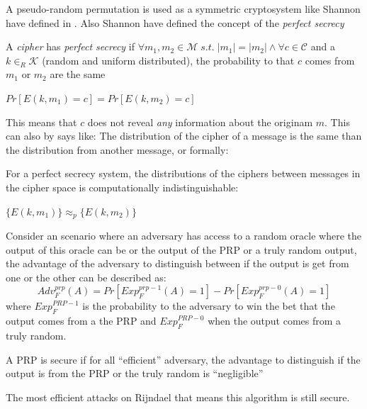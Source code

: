 \documentclass[a4paper,twoside]{llncs}
\begin{document}
A pseudo-random permutation is used as a symmetric cryptosystem like Shannon have defined in \cite{shannon-comTheorySecSys}. Also Shannon have defined the concept of the \emph{perfect secrecy}
\begin{definition}
 A \emph{cipher} has \emph{perfect secrecy} if $\forall m_1, m_2 \in \mathcal{M} \;s.t.\; \left| m_1 \right| = \left| m_2 \right| \wedge \forall c \in \mathcal{C}$ and a $k\in_R\mathcal{K}$ (random and uniform distributed), the probability to that $c$ comes from $m_1$ or $m_2$ are the same
 \begin{center}
  $Pr[E(k,m_1)=c] = Pr[E(k,m_2)=c]$
 \end{center}
\end{definition}

This means that $c$ does not reveal \emph{any} information about the originam $m$. This can also by says like: The distribution of the cipher of a message is the same than the distribution from another message, or formally:
\begin{definition}
 For a perfect secrecy system, the distributions of the ciphers between messages in the cipher space is computationally indistinguishable:
 \begin{center}
  $\{ E(k,m_1) \} \approx_p \{ E(k,m_2) \} $
 \end{center}
\end{definition}

Consider an scenario where an adversary has access to a random oracle where the output of this oracle can be or the output of the PRP or a truly random output, the advantage of the adversary to distinguish between if the output is get from one or the other can be described as:
\begin{equation}\label{eq:prpAdv}
 {Adv}_{F}^{prp}(A) = Pr[{Exp}_{F}^{prp-1}(A)=1]-Pr[{Exp}_{F}^{prp-0}(A)=1]
\end{equation}
where ${Exp}_{F}^{PRP-1}$ is the probability to the adversary to win the bet that the output comes from a the PRP and ${Exp}_{F}^{PRP-0}$ when the output comes from a truly random.

\begin{definition}\label{def:securePRP}
 A PRP is secure if for all ``efficient'' adversary, the advantage to distinguish if the output is from the PRP or the truly random is ``negligible''
\end{definition}
The most efficient attacks on Rijndael      that means this algorithm is still secure.
\end{document}
